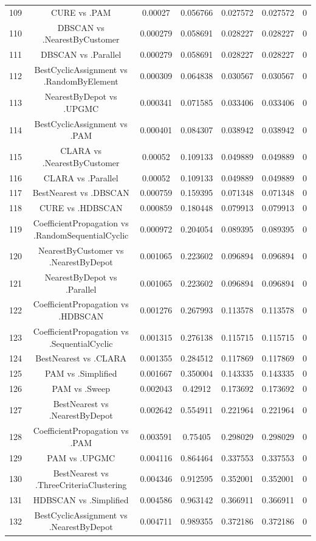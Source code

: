 \documentclass[a4paper,10pt]{article}
\begin{document}
\begin{landscape}
\begin{table}[!htp]
\begin{tabular}{ccccccc}
109&CURE vs .PAM&0.00027&0.056766&0.027572&0.027572&0\\
110&DBSCAN vs .NearestByCustomer&0.000279&0.058691&0.028227&0.028227&0\\
111&DBSCAN vs .Parallel&0.000279&0.058691&0.028227&0.028227&0\\
112&BestCyclicAssignment vs .RandomByElement&0.000309&0.064838&0.030567&0.030567&0\\
113&NearestByDepot vs .UPGMC&0.000341&0.071585&0.033406&0.033406&0\\
114&BestCyclicAssignment vs .PAM&0.000401&0.084307&0.038942&0.038942&0\\
115&CLARA vs .NearestByCustomer&0.00052&0.109133&0.049889&0.049889&0\\
116&CLARA vs .Parallel&0.00052&0.109133&0.049889&0.049889&0\\
117&BestNearest vs .DBSCAN&0.000759&0.159395&0.071348&0.071348&0\\
118&CURE vs .HDBSCAN&0.000859&0.180448&0.079913&0.079913&0\\
119&CoefficientPropagation vs .RandomSequentialCyclic&0.000972&0.204054&0.089395&0.089395&0\\
120&NearestByCustomer vs .NearestByDepot&0.001065&0.223602&0.096894&0.096894&0\\
121&NearestByDepot vs .Parallel&0.001065&0.223602&0.096894&0.096894&0\\
122&CoefficientPropagation vs .HDBSCAN&0.001276&0.267993&0.113578&0.113578&0\\
123&CoefficientPropagation vs .SequentialCyclic&0.001315&0.276138&0.115715&0.115715&0\\
124&BestNearest vs .CLARA&0.001355&0.284512&0.117869&0.117869&0\\
125&PAM vs .Simplified&0.001667&0.350004&0.143335&0.143335&0\\
126&PAM vs .Sweep&0.002043&0.42912&0.173692&0.173692&0\\
127&BestNearest vs .NearestByDepot&0.002642&0.554911&0.221964&0.221964&0\\
128&CoefficientPropagation vs .PAM&0.003591&0.75405&0.298029&0.298029&0\\
129&PAM vs .UPGMC&0.004116&0.864464&0.337553&0.337553&0\\
130&BestNearest vs .ThreeCriteriaClustering&0.004346&0.912595&0.352001&0.352001&0\\
131&HDBSCAN vs .Simplified&0.004586&0.963142&0.366911&0.366911&0\\
132&BestCyclicAssignment vs .NearestByDepot&0.004711&0.989355&0.372186&0.372186&0\\

\end{tabular}
\end{table}
\end{landscape}
\end{document}
